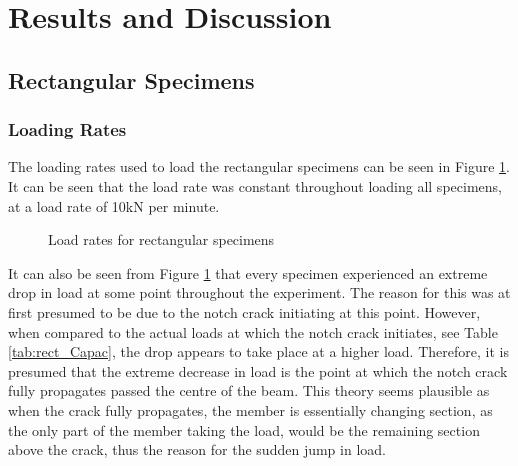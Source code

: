 \documentclass[11pt,a4paper]{article}
\numberwithin{equation}{subsection}
\begin{document}
\vspace*{\baselineskip}

\pagebreak


\section{Results and Discussion}

\subsection{Rectangular Specimens}
\subsubsection{Loading Rates}
The loading rates used to load the rectangular specimens can be seen in Figure \ref{fig:Rect_load}. It can be seen that the load rate was constant throughout loading all specimens, at a load rate of 10kN per minute. 

\begin{figure}[h]
	\begin{center}
	\end{center}
	\caption{Load rates for rectangular specimens}
	\label{fig:Rect_load}
\end{figure}

\noindent
It can also be seen from Figure \ref{fig:Rect_load} that every specimen experienced an extreme drop in load at some point throughout the experiment. The reason for this was at first presumed to be due to the notch crack initiating at this point. However, when compared to the actual loads at which the notch crack initiates, see Table \ref{tab:rect_Capac}, the drop appears to take place at a higher load. Therefore, it is presumed that the extreme decrease in load is the point at which the notch crack fully propagates passed the centre of the beam. This theory seems plausible as when the crack fully propagates, the member is essentially changing section, as the only part of the member taking the load, would be the remaining section above the crack, thus the reason for the sudden jump in load.  
\end{document}
